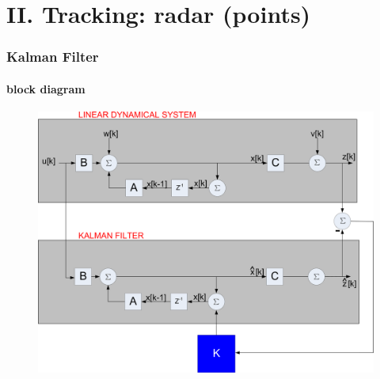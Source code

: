 \section{II. Tracking: radar (points)}



\begin{frame}
\frametitle{Kalman Filter}
\framesubtitle{block diagram}
\logoCSIPCPL\mypagenum
	\begin{figure}
		\includegraphics[width=1.0\textwidth]{thesis/TRK_KalmanFilter_blockDiagram.pdf}
	\end{figure}
\end{frame}






